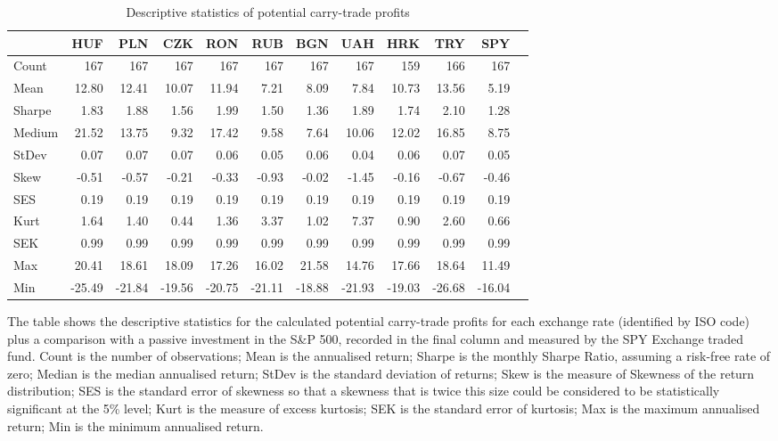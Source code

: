 \documentclass[12pt, a4paper, oneside]{article}\usepackage[]{graphicx}\usepackage[]{color}
\begin{document}
\begin{sidewaystable}[p]
\begin{threeparttable}
\centering
\begin{tabular}{p{5cm}rrrrrrrrrrr}
  \hline
 & HUF & PLN & CZK & RON & RUB & BGN & UAH & HRK & TRY & SPY\\ 
  \hline
Count & 167 & 167 & 167 & 167 & 167 & 167 & 167 & 159 & 166 & 167\\ 
  Mean & 12.80 & 12.41 & 10.07 & 11.94 & 7.21 & 8.09 & 7.84 & 10.73 & 13.56 & 5.19\\ 
  Sharpe & 1.83 & 1.88 & 1.56 & 1.99 & 1.50 & 1.36 & 1.89 & 1.74 & 2.10 & 1.28 \\ 
  Medium & 21.52 & 13.75 & 9.32 & 17.42 & 9.58 & 7.64 & 10.06 & 12.02 & 16.85 & 8.75 \\ 
  StDev & 0.07 & 0.07 & 0.07 & 0.06 & 0.05 & 0.06 & 0.04 & 0.06 & 0.07 & 0.05 \\ 
  Skew & -0.51 & -0.57 & -0.21 & -0.33 & -0.93 & -0.02 & -1.45 & -0.16 & -0.67 & -0.46 \\ 
  SES & 0.19 & 0.19 & 0.19 & 0.19 & 0.19 & 0.19 & 0.19 & 0.19 & 0.19 & 0.19\\ 
  Kurt & 1.64 & 1.40 & 0.44 & 1.36 & 3.37 & 1.02 & 7.37 & 0.90 & 2.60 & 0.66\\ 
  SEK & 0.99 & 0.99 & 0.99 & 0.99 & 0.99 & 0.99 & 0.99 & 0.99 & 0.99 & 0.99\\ 
  Max & 20.41 & 18.61 & 18.09 & 17.26 & 16.02 & 21.58 & 14.76 & 17.66 & 18.64 & 11.49\\ 
  Min & -25.49 & -21.84 & -19.56 & -20.75 & -21.11 & -18.88 & -21.93 & -19.03 & -26.68 & -16.04\\ 
   \hline
\end{tabular}
\begin{tablenotes}
\small 
\item The table shows the descriptive statistics for the calculated potential carry-trade profits for each exchange rate (identified by ISO code) plus a comparison with a passive investment in the S\&P 500, recorded in the final column and measured by the SPY Exchange traded fund. Count is the number of observations; Mean is the annualised return; Sharpe is the monthly Sharpe Ratio, assuming a risk-free rate of zero; Median is the median annualised return; StDev is the standard deviation of returns; Skew is the measure of Skewness of the return distribution; SES is the standard error of skewness so that a skewness that is twice this size could be considered to be statistically significant at the 5\% level; Kurt is the measure of excess kurtosis; SEK is the standard error of kurtosis; Max is the maximum annualised return; Min is the minimum annualised return. 
\end{tablenotes}
\caption{Descriptive statistics of potential carry-trade profits}
\label{tabref:desst}
\end{threeparttable}
\end{sidewaystable}
\end{document}

